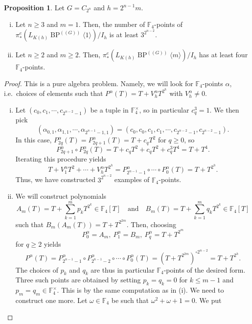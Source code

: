 \documentclass[a4paper, 10pt]{article}
\newcommand{\F}{\mathbb F}
\newcommand{\BPG}{{\BP^{(\!(G)\!)}}}
\newcommand{\BPGm}{{\BP^{(\!(G)\!)}}\langle m\rangle}
\newcommand{\BP}{\operatorname{BP}}
\theoremstyle{definition}
\newtheorem{proposition}[proposition]{Proposition}
\begin{document}
\begin{proposition} \label{prop: F4 points computation}
    Let $G = C_{2^n}$ and $h = 2^{n-1}m$.
    \begin{enumerate}[(i)]
        \item Let $n \geq 3$ and $m = 1$. Then, the number of $\F_4$-points of \(\pi_*^e(L_{K(h)}\BPG\langle 1\rangle)/I_h\) is at least $3^{2^{n-2}}$.
        \item Let $n \geq 2$ and $m \geq 2$. Then, \(\pi^e_*(L_{K(h)}\BPGm)/I_h\) has at least four $\F_4$-points.
    \end{enumerate}
\end{proposition}

\begin{proof}
    This is a pure algebra problem. Namely, we will look for $\F_4$-points $\alpha$, i.e.~choices of elements such that $P^{\alpha}(T) = T + V_h^{\alpha} T^{2^h}$ with $V_h^{\alpha} \neq 0$.
    \begin{enumerate}[(i)]
        \item Let $(c_0, c_1, \cdots, c_{2^{n-2}-1})$ be a tuple in $\F_4^{\times}$, so in particular $c_q^3 = 1$. We then pick
        \[ (\alpha_{0,1}, \alpha_{1,1}, \cdots, \alpha_{2^{n-1}-1,1}) = (c_0, c_0, c_1, c_1, \cdots, c_{2^{n-2}-1}, c_{2^{n-2}-1}). \]
        In this case, $P_{2q}^{\alpha}(T) = P_{2q+1}^{\alpha}(T) = T + c_q T^2$ for $q \geq 0$, so 
        \[ P_{2q+1}^{\alpha} \circ P_{2q}^{\alpha}(T) = T + c_q T^2 + c_q T^2 + c_q^3 T^4 = T + T^4. \]
        Iterating this procedure yields
        \[ T+V^\alpha_1T^2+\cdots+V^\alpha_hT^{2^h} = P^\alpha_{2^{n-1}-1}\circ\cdots\circ P^\alpha_0(T) =T+T^{2^h}. \]
        Thus, we have constructed $3^{2^{n-2}}$ examples of $\F_4$-points.
        \item We will construct polynomials
        \[ A_m(T) = T + \sum_{k=1}^{m} p_k T^{2^k} \in \F_4[T] \quad \text{and} \quad B_m(T) = T + \sum_{k = 1}^m q_k T^{2^k} \in \F_4[T] \]
        such that $B_m(A_m(T)) = T + T^{2^{2m}} $. Then, choosing
        \[ P_0^{\alpha} = A_m, \ P_1^{\alpha} = B_m, \ P_{q}^{\alpha} = T + T^{2^m} \]
        for $q \geq 2$ yields
        \[ P^{\alpha}(T) = P_{2^{n-1}-1}^{\alpha} \circ P_{2^{n-1}-2}^{\alpha} \circ \cdots \circ P_0^{\alpha}(T) = (T + T^{2^{2m}})^{\circ 2^{n-2}} = T + T^{2^h}. \]
        The choices of $p_k$ and $q_k$ are thus in particular $\F_4$-points of the desired form. Three such points are obtained by setting $p_k = q_k = 0$ for $k \leq m-1$ and $p_m = q_m \in \F_4^{\times}$. This is by the same computation as in (i). We need to construct one more. Let $\omega \in \F_4$ be such that $\omega^2 + \omega + 1 = 0$. We put 

\end{enumerate}
\end{proof}
\end{document}
